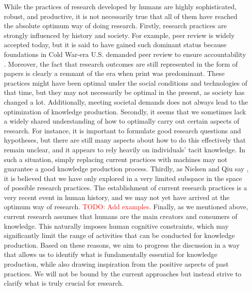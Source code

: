 \documentclass{book}
\begin{document}
While the practices of research developed by humans are highly sophisticated, robust, and productive, it is not necessarily true that all of them have reached the absolute optimum way of doing research. Firstly, research practices are strongly influenced by history and society. For example, peer review is widely accepted today, but it is said to have gained such dominant status because foundations in Cold War-era U.S. demanded peer review to ensure accountability \cite{baldwin2018scientific}. Moreover, the fact that research outcomes are still represented in the form of papers is clearly a remnant of the era when print was predominant. These practices might have been optimal under the social conditions and technologies of that time, but they may not necessarily be optimal in the present, as society has changed a lot. Additionally, meeting societal demands does not always lead to the optimization of knowledge production. Secondly, it seems that we sometimes lack a widely shared understanding of how to optimally carry out certain aspects of research. For instance, it is important to formulate good research questions and hypotheses, but there are still many aspects about how to do this effectively that remain unclear, and it appears to rely heavily on individuals' tacit knowledge. In such a situation, simply replacing current practices with machines may not guarantee a good knowledge production process. Thirdly, as Nielsen and Qiu say \cite{nielsen}, it is believed that we have only explored in a very limited subspace in the space of possible research practices. The establishment of current research practices is a very recent event in human history, and we may not yet have arrived at the optimum way of research. \textcolor{red}{TODO: Add examples.} Finally, as we mentioned above, current research assumes that humans are the main creators and consumers of knowledge. This naturally imposes human cognitive constraints, which may significantly limit the range of activities that can be conducted for knowledge production. Based on these reasons, we aim to progress the discussion in a way that allows us to identify what is fundamentally essential for knowledge production, while also drawing inspiration from the positive aspects of past practices. We will not be bound by the current approaches but instead strive to clarify what is truly crucial for research.
\end{document}
